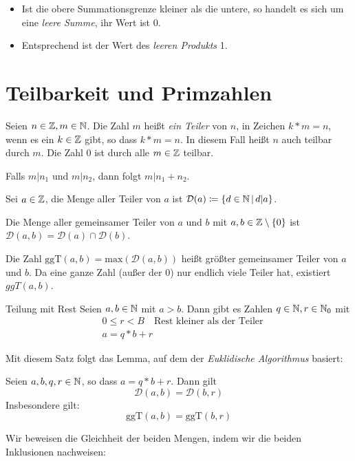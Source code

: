 \bemerkung
\begin{itemize}
  \item Ist die obere Summationsgrenze kleiner als die untere, so handelt es sich um eine \emph{leere Summe}, ihr Wert ist 0.
  \item Entsprechend ist der Wert des \emph{leeren Produkts} 1.
\end{itemize}


\section{Teilbarkeit und Primzahlen}
Seien $n\in\mathbb{Z}, m\in\mathbb{N}$. Die Zahl $m$ heißt \emph{ein Teiler} von $n$, in Zeichen $k* m=n$, wenn es ein $k\in\mathbb{Z}$ gibt, so dass $k* m = n$. In diesem Fall heißt $n$ auch teilbar durch $m$.
Die Zahl $0$ ist durch alle $m\in\mathbb{Z}$ teilbar.

Falls $m|n_1$ und $m|n_2$, dann folgt $m|n_1+n_2$.

Sei $a\in\mathbb{Z}$, die Menge aller Teiler von $a$ ist $\mathcal{D}(a)\coloneqq\left\{ d\in\mathbb{N} \,\middle|\, d|a \right\}$.

Die Menge aller gemeinsamer Teiler von $a$ und $b$ mit $a,b\in\mathbb{Z}\setminus\{ 0\}$ ist $\mathcal{D}(a,b) = \mathcal{D}(a) \cap \mathcal{D}(b)$.

Die Zahl $\mathrm{ggT}(a,b) = \mathrm{max}(\mathcal{D}(a,b))$ heißt größter gemeinsamer Teiler von $a$ und $b$. Da eine ganze Zahl (außer der $0$) nur endlich viele Teiler hat, existiert $ggT(a,b)$.

\begin{satz}{Teilung mit Rest}
  Seien $a,b\in\mathbb{N}$ mit $a>b$. Dann gibt es Zahlen $q\in\mathbb{N}, r\in\mathbb{N}_0$ mit
  \begin{align*}
    &0\leq r<B \quad\text{Rest kleiner als der Teiler}\\
    &a=q*b+r
  \end{align*}
\end{satz}
Mit diesem Satz folgt das Lemma, auf dem der \emph{Euklidische Algorithmus} basiert:
\begin{lemma}{}
  Seien $a,b,q,r\in\mathbb{N}$, so dass $a=q*b+r$. Dann gilt
  \begin{equation*}
    \mathcal{D}(a,b)=\mathcal{D}(b,r)
  \end{equation*}
  Insbesondere gilt:
  \begin{equation*}
    \mathrm{ggT}(a,b)=\mathrm{ggT}(b,r)
  \end{equation*}
\end{lemma}
\beweis
Wir beweisen die Gleichheit der beiden Mengen, indem wir die beiden Inklusionen nachweisen:

